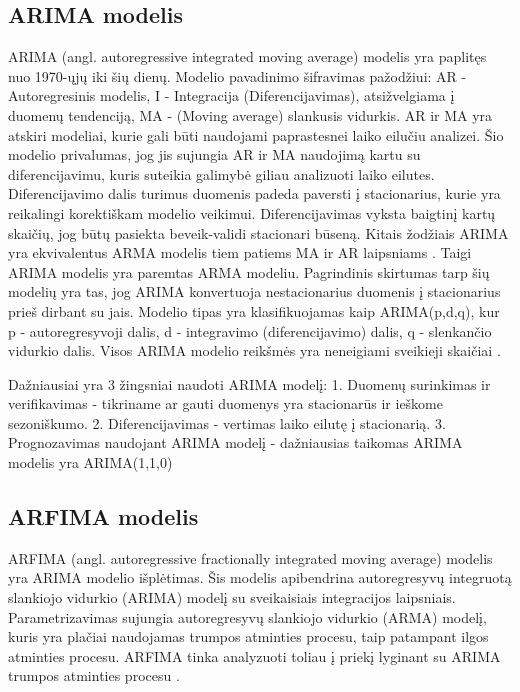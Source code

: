 \documentclass{VUMIFInfKursinis}
\begin{document}
\subsection {ARIMA modelis}
ARIMA (angl. autoregressive integrated moving average) modelis yra paplitęs nuo 1970-ųjų iki šių dienų. Modelio pavadinimo šifravimas
pažodžiui: AR - Autoregresinis modelis, I - Integracija (Diferencijavimas), atsižvelgiama į duomenų tendenciją, MA - (Moving average) slankusis vidurkis.
AR ir MA yra atskiri modeliai, kurie gali būti naudojami paprastesnei laiko eilučiu analizei. Šio modelio privalumas, jog jis sujungia AR ir MA naudojimą kartu su
diferencijavimu, kuris suteikia galimybė giliau analizuoti laiko eilutes. Diferencijavimo dalis turimus duomenis padeda paversti į stacionarius, 
kurie yra reikalingi korektiškam modelio veikimui. Diferencijavimas vyksta baigtinį kartų skaičių, jog būtų pasiekta beveik-validi stacionari būseną. 
Kitais žodžiais ARIMA yra ekvivalentus ARMA modelis tiem patiems MA ir AR laipsniams \cite{hua2020bitcoin}. Taigi ARIMA modelis yra paremtas ARMA modeliu. 
Pagrindinis skirtumas tarp šių modelių yra tas, jog ARIMA konvertuoja nestacionarius duomenis į stacionarius prieš dirbant su jais. Modelio tipas yra 
klasifikuojamas kaip ARIMA(p,d,q), kur p - autoregresyvoji dalis, d - integravimo (diferencijavimo) dalis, q - slenkančio vidurkio dalis. Visos ARIMA modelio
reikšmės yra neneigiami sveikieji skaičiai \cite{mondal2014study}.

Dažniausiai yra 3 žingsniai naudoti ARIMA modelį:
1. Duomenų surinkimas ir verifikavimas - tikriname ar gauti duomenys yra stacionarūs ir ieškome sezoniškumo.
2. Diferencijavimas - vertimas laiko eilutę į stacionarią.
3. Prognozavimas naudojant ARIMA modelį - dažniausias taikomas ARIMA modelis yra ARIMA(1,1,0)

\subsection {ARFIMA modelis}
ARFIMA (angl. autoregressive fractionally integrated moving average) modelis yra ARIMA modelio išplėtimas.
Šis modelis apibendrina autoregresyvų integruotą slankiojo vidurkio (ARIMA) modelį su sveikaisiais integracijos laipsniais.
Parametrizavimas sujungia autoregresyvų slankiojo vidurkio (ARMA) modelį, kuris yra plačiai naudojamas trumpos atminties procesu, taip 
patampant ilgos atminties procesu. ARFIMA tinka analyzuoti toliau į priekį lyginant su ARIMA trumpos atminties procesu \cite{samimi2009long}.
\end{document}
